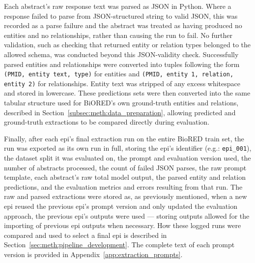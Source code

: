 Each abstract's raw response text was parsed as JSON in Python. Where a response failed to parse from JSON-structured string to valid JSON, this was recorded as a parse failure and the abstract was treated as having produced no entities and no relationships, rather than causing the run to fail. No further validation, such as checking that returned entity or relation types belonged to the allowed schema, was conducted beyond this JSON-validity check. Successfully parsed entities and relationships were converted into tuples following the form \texttt{(PMID, entity text, type)} for entities and \texttt{(PMID, entity 1, relation, entity 2)} for relationships. Entity text was stripped of any excess whitespace and stored in lowercase. These predictions sets were then converted into the same tabular structure used for BiORED's own ground-truth entities and relations, described in Section~\ref{subsec:meth:data_preparation}, allowing predicted and ground-truth extractions to be compared directly during evaluation.

Finally, after each \gls{epi}'s final extraction run on the entire BioRED train set, the run was exported as its own run in full, storing the \gls{epi}'s identifier (e.g.: \texttt{epi\_001}), the dataset split it was evaluated on, the prompt and evaluation version used, the number of abstracts processed, the count of failed JSON parses, the raw prompt template, each abstract's raw total model output, the parsed entity and relation predictions, and the evaluation metrics and errors resulting from that run. The raw and parsed extractions were stored as, as previously mentioned, when a new \gls{epi} reused the previous \gls{epi}'s prompt version and only updated the evaluation approach, the previous \gls{epi}'s outputs were used --- storing outputs allowed for the importing of previous \gls{epi} outputs when necessary. How these logged runs were compared and used to select a final \gls{epi} is described in Section~\ref{sec:meth:pipeline_development}. The complete text of each prompt version is provided in Appendix~\ref{app:extraction_prompts}.

